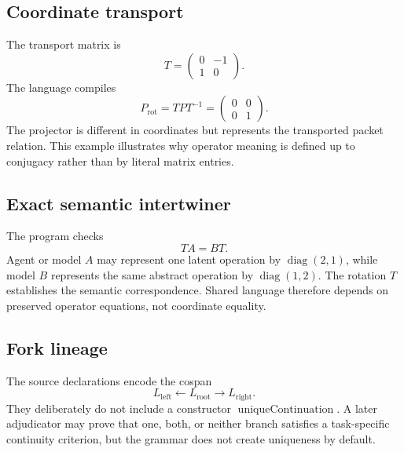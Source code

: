 \subsection{Coordinate transport}



The transport matrix is
\[
T=
\begin{pmatrix}
0&-1\\
1&0
\end{pmatrix}.
\]
The language compiles
\[
P_{\mathrm{rot}}=TPT^{-1}
=
\begin{pmatrix}
0&0\\
0&1
\end{pmatrix}.
\]
The projector is different in coordinates but represents the transported packet
relation.  This example illustrates why operator meaning is defined up to
conjugacy rather than by literal matrix entries.

\subsection{Exact semantic intertwiner}



The program checks
\[
TA=BT.
\]
Agent or model \(A\) may represent one latent operation by
\(\operatorname{diag}(2,1)\), while model \(B\) represents the same abstract
operation by \(\operatorname{diag}(1,2)\).  The rotation \(T\) establishes the
semantic correspondence.  Shared language therefore depends on preserved
operator equations, not coordinate equality.

\subsection{Fork lineage}



The source declarations encode the cospan
\[
L_{\mathrm{left}}
\longleftarrow
L_{\mathrm{root}}
\longrightarrow
L_{\mathrm{right}}.
\]
They deliberately do not include a constructor
\(\operatorname{uniqueContinuation}\).  A later adjudicator may prove that one,
both, or neither branch satisfies a task-specific continuity criterion, but the
grammar does not create uniqueness by default.

